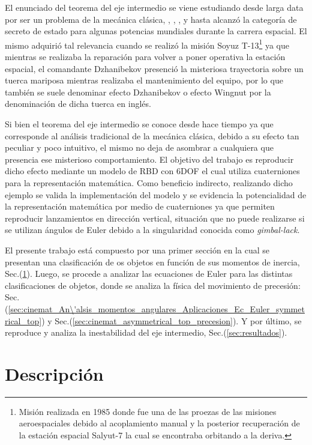 \documentclass[oneside,a4paper,english,links]{amca}
\begin{document}
El enunciado del teorema del eje intermedio se viene estudiando desde larga data por ser un problema de la mec\'anica cl\'asica, \cite{poinsot1851theorie}, \cite{landau1976mechanics}, \cite{ashbaugh1991twisting}, y hasta alcanz\'o la categor\'ia de secreto de estado para algunas potencias mundiales durante la carrera espacial. El mismo adquiri\'o tal relevancia cuando se realiz\'o la misi\'on Soyuz T-13\footnote{Misi\'on realizada en 1985 donde fue una de las proezas de las misiones aeroespaciales debido al acoplamiento manual y la posterior recuperaci\'on de la estaci\'on espacial Salyut-7 la cual se encontraba orbitando a la deriva.} ya que mientras se realizaba la reparaci\'on para volver a poner operativa la estaci\'on espacial, el comandante Dzhanibekov presenci\'o la misteriosa trayectoria sobre un tuerca mariposa mientras realizaba el mantenimiento del equipo, por lo que tambi\'en se suele denominar efecto Dzhanibekov o efecto Wingnut por la denominaci\'on de dicha tuerca en ingl\'es.

Si bien el teorema del eje intermedio se conoce desde hace tiempo ya que corresponde al an\'alisis tradicional de la mec\'anica cl\'asica, debido a su efecto tan peculiar y poco intuitivo, el mismo no deja de asombrar a cualquiera que presencia ese misterioso comportamiento. El objetivo del trabajo es reproducir dicho efecto mediante un modelo de RBD con 6DOF el cual utiliza cuaterniones para la representaci\'on matem\'atica. Como beneficio indirecto, realizando dicho ejemplo se valida la implementaci\'on del modelo y se evidencia la potencialidad de la representaci\'on matem\'atica por medio de cuaterniones ya que permiten reproducir lanzamientos en direcci\'on vertical, situaci\'on que no puede realizarse si se utilizan \'angulos de Euler debido a la singularidad conocida como \textit{gimbal-lack}.

El presente trabajo est\'a compuesto por una primer secci\'on en la cual se presentan una clasificaci\'on de os objetos en funci\'on de sus momentos de inercia, Sec.(\ref{sec:Descripci\'on}). Luego, se procede a analizar las ecuaciones de Euler para las distintas clasificaciones de objetos, donde se analiza la f\'isica del movimiento de precesi\'on: Sec.(\ref{sec:cinemat_An\'alsis_momentos_angulares_Aplicaciones_Ec_Euler_symmetrical_top}) y Sec.(\ref{sec:cinemat_asymmetrical_top_precesion}). Y por \'ultimo, se reproduce y analiza la inestabilidad del eje intermedio, Sec.(\ref{sec:resultados}).

\section{Descripci\'on}
\label{sec:Descripci\'on}
\end{document}
